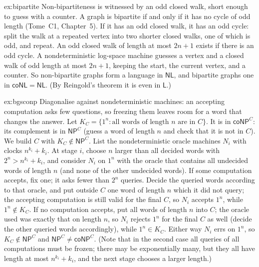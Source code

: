 \begin{solution}{ex:bipartite}
\idea Non-bipartiteness is witnessed by an odd closed walk, short enough to guess with a counter.
\writeup A graph is bipartite if and only if it has no cycle of odd length (Tome~C1, Chapter~5). If it has an odd closed walk, it has an odd cycle: split the walk at a repeated vertex into two shorter closed walks, one of which is odd, and repeat. An odd closed walk of length at most $2n+1$ exists if there is an odd cycle. A nondeterministic log-space machine guesses a vertex and a closed walk of odd length at most $2n+1$, keeping the start, the current vertex, and a counter. So non-bipartite graphs form a language in $\mathsf{NL}$, and bipartite graphs one in $\mathsf{coNL}=\mathsf{NL}$. (By Reingold's theorem it is even in $\mathsf L$.)
\end{solution}

\begin{solution}{ex:bgsconp}
\idea Diagonalise against nondeterministic machines: an accepting computation asks few questions, so freezing them leaves room for a word that changes the answer.
\writeup Let $K_C=\{1^n:\text{all words of length }n\text{ are in }C\}$. It is in $\mathsf{coNP}^C$: its complement is in $\mathsf{NP}^C$ (guess a word of length $n$ and check that it is not in $C$). We build $C$ with $K_C\notin\mathsf{NP}^C$. List the nondeterministic oracle machines $N_i$ with clocks $n^{k_i}+k_i$. At stage $i$, choose $n$ larger than all decided words with $2^n>n^{k_i}+k_i$, and consider $N_i$ on $1^n$ with the oracle that contains all undecided words of length $n$ (and none of the other undecided words). If some computation accepts, fix one; it asks fewer than $2^n$ queries. Decide the queried words according to that oracle, and put outside $C$ one word of length $n$ which it did not query; the accepting computation is still valid for the final $C$, so $N_i$ accepts $1^n$, while $1^n\notin K_C$. If no computation accepts, put all words of length $n$ into $C$; the oracle used was exactly that on length $n$, so $N_i$ rejects $1^n$ for the final $C$ as well (decide the other queried words accordingly), while $1^n\in K_C$. Either way $N_i$ errs on $1^n$, so $K_C\notin\mathsf{NP}^C$ and $\mathsf{NP}^C\ne\mathsf{coNP}^C$. (Note that in the second case all queries of all computations must be frozen; there may be exponentially many, but they all have length at most $n^{k_i}+k_i$, and the next stage chooses a larger length.)
\end{solution}

